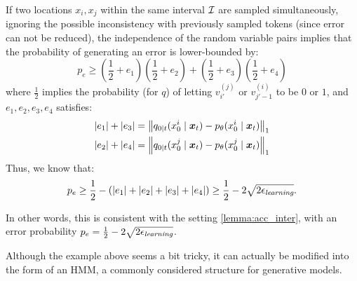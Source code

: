 \begin{example}
If two locations $x_i,x_j$ within the same interval ${\mathcal{I}}$ are sampled simultaneously, ignoring the possible inconsistency with previously sampled tokens (since error can not be reduced), the independence of the random variable pairs implies that the probability of generating an error is lower-bounded by:
$$p_e\geq (\frac{1}{2}+e_1)(\frac{1}{2}+e_2)+(\frac{1}{2}+e_3)(\frac{1}{2}+e_4)$$
where $\frac{1}{2}$ implies the probability (for $q$) of letting $v_{i'}^{(j)}$ or $v_{j'-1}^{(i)}$ to be $0$ or $1$, and $e_1,e_2,e_3,e_4$ satisfies:
\begin{align*}
    |e_1|+|e_3|&=\left\lVert q_{0|t}(x_0^i \mid {\bm{x}}_t)-p_{\theta}(x_0^i \mid {\bm{x}}_t)\right\rVert_1\\
    |e_2|+|e_4|&=\left\lVert q_{0|t}(x_0^j \mid {\bm{x}}_t)-p_{\theta}(x_0^j \mid {\bm{x}}_t)\right\rVert_1
\end{align*}
Thus, we know that:
$$p_e\geq \frac{1}{2}-(|e_1|+|e_2|+|e_3|+|e_4|)\geq \frac{1}{2}-2\sqrt{2{\epsilon}_\textit{learning}}.$$

In other words, this is consistent with the setting \cref{lemma:acc_inter}, with an error probability $p_e=\frac{1}{2}-2\sqrt{2{\epsilon}_\textit{learning}}$.

\end{example}

Although the example above seems a bit tricky, it can actually be modified into the form of an HMM, a commonly considered structure for generative models.

